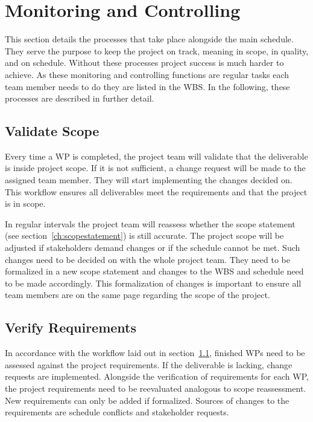 \section{Monitoring and Controlling}
\label{ch:monitoringcontrolling}
This section details the processes that take place alongside the main schedule. They serve the purpose to keep the project on track, meaning in scope, in quality, and on schedule. Without these processes project success is much harder to achieve. As these monitoring and controlling functions are regular tasks each team member needs to do they are listed in the \ac{WBS}. In the following, these processes are described in further detail.

\subsection{Validate Scope}
\label{ch:validatescope}
Every time a \ac{WP} is completed, the project team will validate that the deliverable is inside project scope. If it is not sufficient, a change request will be made to the assigned team member. They will start implementing the changes decided on. This workflow ensures all deliverables meet the requirements and that the project is in scope.

In regular intervals the project team will reassess whether the scope statement (see section~\ref{ch:scopestatement}) is still accurate. The project scope will be adjusted if stakeholders demand changes or if the schedule cannot be met. Such changes need to be decided on with the whole project team. They need to be formalized in a new scope statement and changes to the \ac{WBS} and schedule need to be made accordingly. This formalization of changes is important to ensure all team members are on the same page regarding the scope of the project.

\subsection{Verify Requirements}
\label{ch:verifyrequirements}
In accordance with the workflow laid out in section~\ref{ch:validatescope}, finished \ac{WP}s need to be assessed against the project requirements. If the deliverable is lacking, change requests are implemented. Alongside the verification of requirements for each \ac{WP}, the project requirements need to be reevaluated analogous to scope reassessment. New requirements can only be added if formalized. Sources of changes to the requirements are schedule conflicts and stakeholder requests.

